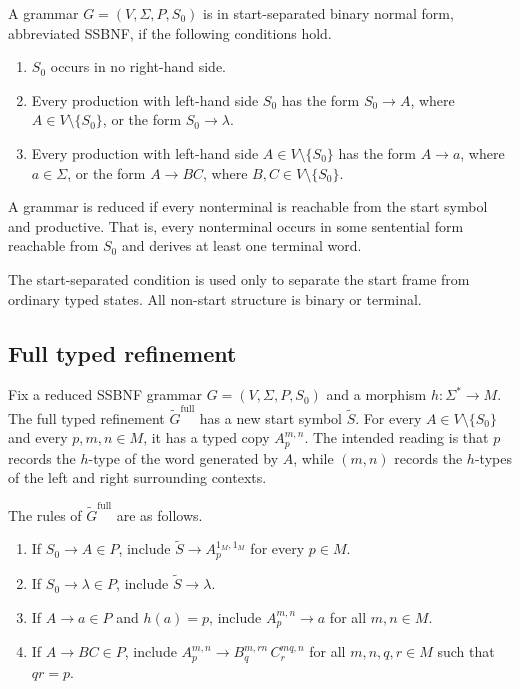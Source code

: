 \documentclass[sub]{jalc}
\newcommand{\eM}{1_M}
\newcommand{\Gfull}{\widetilde G^{\mathrm{full}}}
\begin{document}
\begin{definition}
\label{def:ssbnf}
A grammar \(G=(V,\Sigma,P,S_0)\) is in start-separated binary normal form, abbreviated SSBNF, if the following conditions hold.
\begin{enumerate}[label=\textup{(\roman*)},leftmargin=2.2em]
\item \(S_0\) occurs in no right-hand side.
\item Every production with left-hand side \(S_0\) has the form \(S_0\to A\), where \(A\in V\setminus\{S_0\}\), or the form \(S_0\to\lambda\).
\item Every production with left-hand side \(A\in V\setminus\{S_0\}\) has the form \(A\to a\), where \(a\in\Sigma\), or the form \(A\to BC\), where \(B,C\in V\setminus\{S_0\}\).
\end{enumerate}
\end{definition}

\begin{definition}
\label{def:reduced}
A grammar is reduced if every nonterminal is reachable from the start symbol and productive. That is, every nonterminal occurs in some sentential form reachable from \(S_0\) and derives at least one terminal word.
\end{definition}

The start-separated condition is used only to separate the start frame from ordinary typed states. All non-start structure is binary or terminal.

\subsection{Full typed refinement}
\label{subsec:full-refinement}

Fix a reduced SSBNF grammar \(G=(V,\Sigma,P,S_0)\) and a morphism \(h:\Sigma^*\to M\). The full typed refinement \(\Gfull\) has a new start symbol \(\widetilde S\). For every \(A\in V\setminus\{S_0\}\) and every \(p,m,n\in M\), it has a typed copy \(A_p^{m,n}\). The intended reading is that \(p\) records the \(h\)-type of the word generated by \(A\), while \((m,n)\) records the \(h\)-types of the left and right surrounding contexts.

The rules of \(\Gfull\) are as follows.
\begin{enumerate}[label=\textup{(\arabic*)},leftmargin=2.2em]
\item If \(S_0\to A\in P\), include \(\widetilde S\to A_p^{\eM,\eM}\) for every \(p\in M\).
\item If \(S_0\to\lambda\in P\), include \(\widetilde S\to\lambda\).
\item If \(A\to a\in P\) and \(h(a)=p\), include \(A_p^{m,n}\to a\) for all \(m,n\in M\).
\item If \(A\to BC\in P\), include \(A_p^{m,n}\to B_q^{m,rn}\,C_r^{mq,n}\) for all \(m,n,q,r\in M\) such that \(qr=p\).
\end{enumerate}
\end{document}

